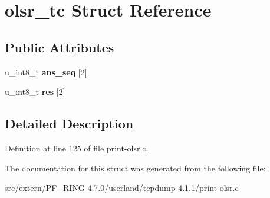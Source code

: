 \hypertarget{structolsr__tc}{
\section{olsr\_\-tc Struct Reference}
\label{structolsr__tc}
}
\subsection*{Public Attributes}
\begin{DoxyCompactItemize}
\item 
\hypertarget{structolsr__tc_a330262ae27d564c7f01a32ffb4be4a55}{
u\_\-int8\_\-t {\bfseries ans\_\-seq} \mbox{[}2\mbox{]}}
\label{structolsr__tc_a330262ae27d564c7f01a32ffb4be4a55}

\item 
\hypertarget{structolsr__tc_ad3e232120f3c28fe54b4ae11fba468e9}{
u\_\-int8\_\-t {\bfseries res} \mbox{[}2\mbox{]}}
\label{structolsr__tc_ad3e232120f3c28fe54b4ae11fba468e9}

\end{DoxyCompactItemize}


\subsection{Detailed Description}


Definition at line 125 of file print-\/olsr.c.



The documentation for this struct was generated from the following file:\begin{DoxyCompactItemize}
\item 
src/extern/PF\_\-RING-\/4.7.0/userland/tcpdump-\/4.1.1/print-\/olsr.c\end{DoxyCompactItemize}
